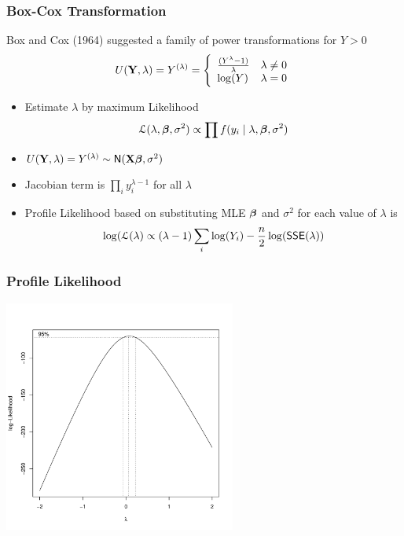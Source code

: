 \documentclass[handout]{beamer}
\begin{document}
  \begin{frame}
    \frametitle{Box-Cox Transformation}
    Box and Cox (1964) suggested a family of power transformations for
    $Y > 0$  \pause
$$
U(\mathbf{Y}, \lambda) =  Y^{(\lambda)} = \left\{
   \begin{array}{ll}
     \frac{(Y^\lambda -1)}{\lambda} & \lambda \neq 0 \\
 \log(Y) & \lambda = 0
   \end{array} \right.
$$  \pause

\begin{itemize}
\item Estimate $\lambda$ by maximum Likelihood  \pause
$${\cal{L}}(\lambda, \boldsymbol{\beta}, \sigma^2) \propto \prod f(y_i \mid \lambda, \boldsymbol{\beta},
\sigma^2)$$

\item  $U(\mathbf{Y}, \lambda) = Y^{(\lambda)} \sim \textsf{N}(\mathbf{X}\boldsymbol{\beta}, \sigma^2)$
  \pause
\item Jacobian term is $\prod_i y_i^{\lambda - 1}$ for all $\lambda$  \pause
\item Profile Likelihood based on substituting MLE $\boldsymbol{\beta}$ and $\sigma^2$
  for each value of $\lambda$ is 
$$\log({\cal{L}}(\lambda) \propto (\lambda -1)
\sum_i \log(Y_i) - \frac{n}{2} \log(\textsf{SSE} (\lambda))$$
\end{itemize}

  \end{frame}
  \begin{frame}
    \frametitle{ Profile Likelihood}

\centerline{\includegraphics[height=3in]{brains-BC}}
  \end{frame}
\end{document}
